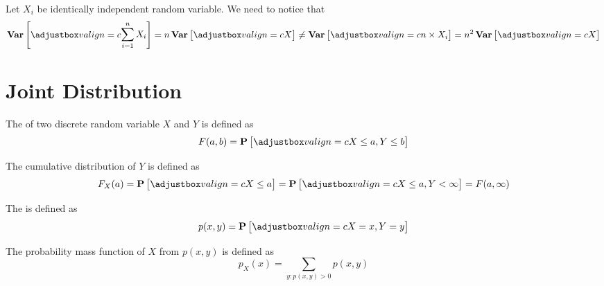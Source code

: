 \begin{theorem}
    Let $X_i$ be identically independent random variable. We need to notice that 
    \begin{equation*}
        \variance{\sum_{i=1}^n X_i} = n \variance{X} \neq \variance{n \times X_i} = n^2 \variance{X}
    \end{equation*}    
\end{theorem}



\section{Joint Distribution}

\begin{definition}
    The  of two discrete random variable $X$ and $Y$ is defined as
    \begin{equation}
        F(a,b) = \probability{ X \leq a, Y \leq b }
    \end{equation}
    
    The cumulative distribution of $Y$ is defined as
    \begin{equation}
        F_X(a) = \probability{X \leq a } =\probability{X \leq a, Y < \infty } = F(a, \infty)
    \end{equation}
    
    The  is defined as 
    \begin{equation}
        p(x,y) =\probability{X = x, Y = y}
    \end{equation}
    
    The probability mass function of $X$ from $p(x,y)$ is defined as
    \begin{equation}
        p_X(x) = \displaystyle \sum_{y: p(x,y) > 0} p(x,y)
    \end{equation}
\end{definition}


